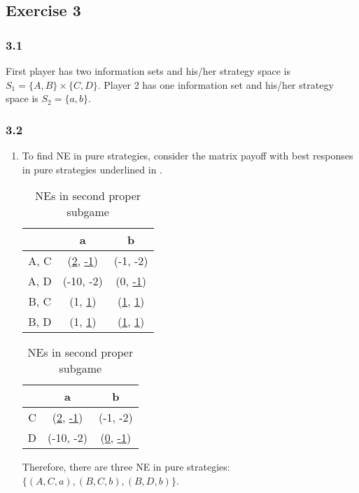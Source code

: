\documentclass[]{article}
\begin{document}
\subsection*{Exercise 3}
\subsubsection*{3.1}

First player has two information sets and his/her strategy space is $S_1 = \{A, B\}\times\{C, D\}$. Player 2 has one information set and his/her strategy space is $S_2 = \{a, b\}$.

\subsubsection*{3.2}
\begin{enumerate}[label=(\roman*)]
	\item To find NE in pure strategies, consider the matrix payoff with best responses in pure strategies underlined in .
	\begin{table}[h]
		\begin{minipage}[b]{0.4\linewidth}
			\begin{tabular}{c|cc}
				& a 		& b 		\\ \hline
				A, C 	& (\underline{2}, \underline{-1}) 	& (-1, -2) 	\\
				A, D	& (-10, -2)	& (0, \underline{-1})	\\
				B, C 	& (1, \underline{1}) 	& (\underline{1}, \underline{1}) 	\\
				B, D	& (1, \underline{1})	& (\underline{1}, \underline{1})\\
			\end{tabular}
			\caption{Entire game in strategic form}
			\label{tab:ex3str}
		\end{minipage}\hfill
		\begin{minipage}[b]{0.4\linewidth}
			\begin{tabular}{c|cc}
				& a & b \\ \hline
				C & (\underline{2}, \underline{-1}) &  (-1, -2) \\
				D & (-10, -2) & (\underline{0}, \underline{-1})
			\end{tabular}
			\caption{NEs in second proper subgame}
			\label{tab:ex3psg2}
		\end{minipage}
	\end{table}
	
	Therefore, there are three NE in pure strategies: $\{(A, C, a), (B, C, b), (B, D, b)\}$.
	

\end{enumerate}
\end{document}
